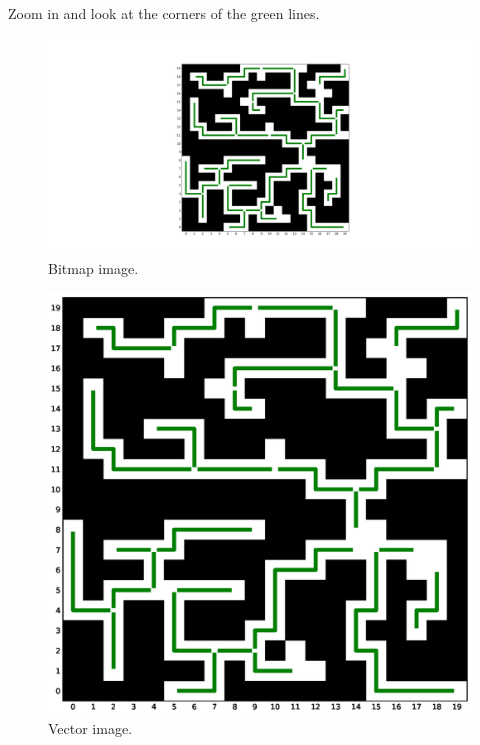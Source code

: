 \documentclass{article}
\begin{document}
Zoom in and look at the corners of the green lines.

\begin{figure}[htp]
    \centering
    \includegraphics[width = 0.8 \linewidth]{bitmap-image.png}
    \caption{Bitmap image.}
\end{figure}

\begin{figure}[htp]
    \centering
    \includegraphics[width = 0.8 \linewidth]{vector-image.eps}
    \caption{Vector image.}
\end{figure}
\end{document}
